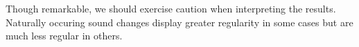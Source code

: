 Though remarkable, we should exercise caution when interpreting the results. 
Naturally occuring sound changes display greater regularity in some cases but are much less regular in others.



